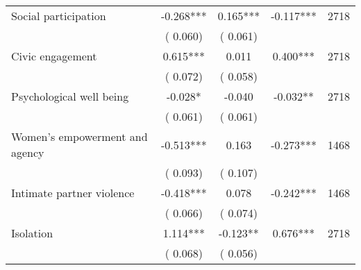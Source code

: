 \begin{tabular}{l*{4}{c}}
 Social participation &             -0.268*** &         0.165*** &          -0.117*** & 2718                       \\  
                 &        (       0.060)                   &        (       0.061)                        &                                                             &                                                      \\      

 Civic engagement &              0.615*** &         0.011 &           0.400*** & 2718                       \\  
                 &        (       0.072)                   &        (       0.058)                        &                                                             &                                                      \\      

 Psychological well being &             -0.028* &        -0.040 &          -0.032** & 2718                       \\  
                 &        (       0.061)                   &        (       0.061)                        &                                                             &                                                      \\      

 Women's empowerment and agency &             -0.513*** &         0.163 &          -0.273*** & 1468                       \\  
                 &        (       0.093)                   &        (       0.107)                        &                                                             &                                                      \\      

 Intimate partner violence &             -0.418*** &         0.078 &          -0.242*** & 1468                       \\  
                 &        (       0.066)                   &        (       0.074)                        &                                                             &                                                      \\      

 Isolation &              1.114*** &        -0.123** &           0.676*** & 2718                       \\  
                 &        (       0.068)                   &        (       0.056)                        &                                                             &                                                      \\      


\end{tabular}

